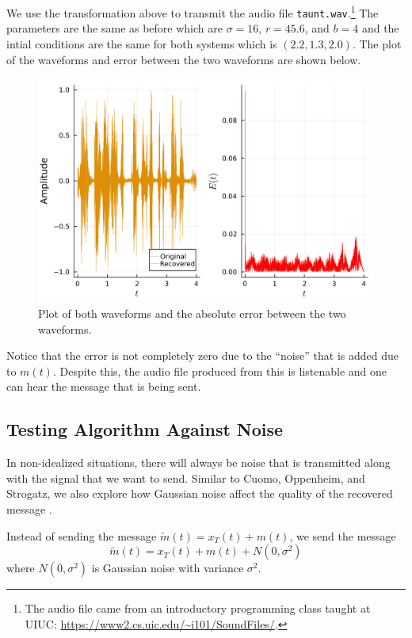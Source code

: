 \documentclass[12pt]{article}
\begin{document}
    We use the transformation above to transmit the audio file \verb|taunt.wav|.\footnote{The audio file came from an introductory programming class taught at UIUC: \url{https://www2.cs.uic.edu/~i101/SoundFiles/}.} The parameters are the same as before which are $\sigma = 16$, $r=45.6$, and $b = 4$ and the intial conditions are the same for both systems which is $(2.2, 1.3, 2.0)$. The plot of the waveforms and error between the two waveforms are shown below. 
    \begin{figure}[H]
        \includegraphics[width=\linewidth]{combined_error_sound_plot_paper.png}
        \centering
        \caption{Plot of both waveforms and the absolute error between the two waveforms.}
    \end{figure}
    Notice that the error is not completely zero due to the ``noise'' that is added due to $m(t)$. Despite this, the audio file produced from this is listenable and one can hear the message that is being sent. 
    \subsection{Testing Algorithm Against Noise}
    In non-idealized situations, there will always be noise that is transmitted along with the signal that we want to send. Similar to Cuomo, Oppenheim, and Strogatz, we also explore how Gaussian noise affect the quality of the recovered message \cite{chaoticnoise}. 

    Instead of sending the message $\tilde{m}(t) = x_T (t) + m(t)$, we send the message 
    \begin{equation*} 
      \tilde{m}(t) = x_T (t) + m(t) + N(0,\sigma^2)
    \end{equation*}
    where $N(0,\sigma^2)$ is Gaussian noise with variance $\sigma^2$. 
\end{document}
